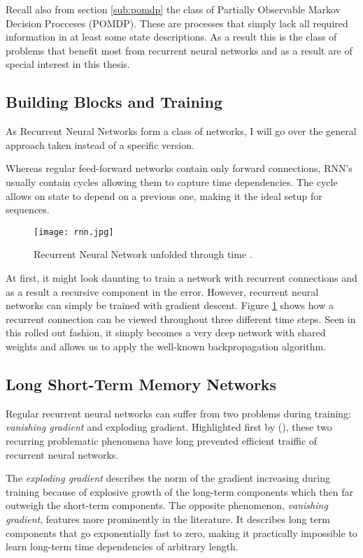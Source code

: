 Recall also from section \ref{sub:pomdp}
the class of Partially Observable Markov Decision Procceses (POMDP).
These are processes that simply lack all required information in
at least some state descriptions.
As a result this is the class of problems that benefit most
from recurrent neural networks
and as a result are of special interest in this thesis.

\subsection{Building Blocks and Training}
\label{sub:building_blocks_and_training}
As Recurrent Neural Networks form a class of networks,
I will go over the general approach taken instead of a specific version.

Whereas regular feed-forward networks contain only forward connections,
RNN's usually contain cycles allowing them to capture time dependencies.
The cycle allows on state to depend on a previous one,
making it the ideal setup for sequences.

\begin{figure}[htpb]
  \centering
  \texttt{[image: rnn.jpg]}
  \caption[Recurrent neural network time unfolding]{
    Recurrent Neural Network unfolded through time
    \parencite{Y.2015dl}.
  }
  \label{fig:rnn}
\end{figure}

At first, it might look daunting to train a network with recurrent connections
and as a result a recursive component in the error.
However, recurrent neural networks can simply be trained with gradient descent.
Figure \ref{fig:rnn} shows how a recurrent connection can be viewed
throughout three different time steps.
Seen in this rolled out fashion,
it simply becomes a very deep network with shared weights
and allows us to apply the well-known backpropagation algorithm.

\subsection{Long Short-Term Memory Networks}
\label{sub:lstm}
Regular recurrent neural networks can suffer from two problems during training:
\textit{vanishing gradient} and {exploding gradient}.
Highlighted first by
\citeauthor{Bengio1994} (\citeyear{Bengio1994}),
these two recurring problematic phenomena have long prevented
efficient traiffic of recurrent neural networks.

The \textit{exploding gradient} describes the norm of the gradient
increasing during training
because of explosive growth of the long-term components
which then far outweigh the short-term components.
The opposite phenomenon, \textit{vanishing gradient},
features more prominently in the literature.
It describes long term components that go exponentially fast to zero,
making it practically impossible to learn
long-term time dependencies of arbitrary length.

